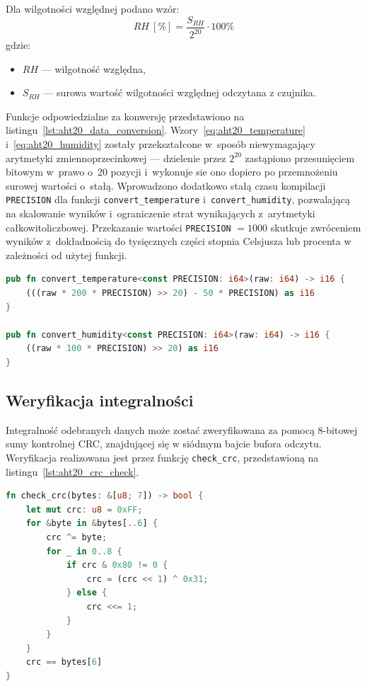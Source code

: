 Dla wilgotności względnej podano wzór:
\begin{equation}
    RH~[\%] = \frac{S_{RH}}{2^{20}} \cdot 100\%
    \label{eq:aht20_humidity}
\end{equation}
\noindent gdzie:
\begin{itemize}
    \item $RH$ --- wilgotność względna,
    \item $S_{RH}$ --- surowa wartość wilgotności względnej odczytana z czujnika.
\end{itemize}

\medskip

Funkcje odpowiedzialne za konwersję przedstawiono na 
listingu~\ref{lst:aht20_data_conversion}. 
Wzory~\eqref{eq:aht20_temperature} i~\eqref{eq:aht20_humidity} zostały 
przekształcone w~sposób niewymagający arytmetyki zmiennoprzecinkowej 
--- dzielenie przez $2^{20}$ zastąpiono przesunięciem bitowym w~prawo o~20 
pozycji i~wykonuje sie ono dopiero po przemnożeniu surowej wartości o~stałą. 
Wprowadzono dodatkowo stałą czasu kompilacji \texttt{PRECISION} dla funkcji
\texttt{convert\_temperature} i~\texttt{convert\_humidity}, pozwalającą na
skalowanie wyników i~ograniczenie strat wynikających z~arytmetyki 
całkowitoliczbowej. 
Przekazanie wartości \texttt{PRECISION} $= 1000$ skutkuje zwróceniem wyników 
z~dokładnością do tysięcznych części stopnia Celsjusza lub procenta w zależności
od użytej funkcji.

\begin{lstlisting}[language=Rust, style=colouredRust, caption={Konwersja surowych danych z modułu AHT20},
                   label={lst:aht20_data_conversion}]
pub fn convert_temperature<const PRECISION: i64>(raw: i64) -> i16 {
    (((raw * 200 * PRECISION) >> 20) - 50 * PRECISION) as i16
}

pub fn convert_humidity<const PRECISION: i64>(raw: i64) -> i16 {
    ((raw * 100 * PRECISION) >> 20) as i16
}
\end{lstlisting}

\subsection*{Weryfikacja integralności}
Integralność odebranych danych może zostać zweryfikowana za pomocą 8-bitowej 
sumy kontrolnej CRC, znajdującej się w siódmym bajcie bufora odczytu. 
Weryfikacja realizowana jest przez funkcję \texttt{check\_crc}, przedstawioną 
na listingu~\ref{lst:aht20_crc_check}.

\begin{lstlisting}[language=Rust, style=colouredRust, caption={Sprawdzanie sumy kontrolnej danych modułu AHT20},
                   label={lst:aht20_crc_check}]
fn check_crc(bytes: &[u8; 7]) -> bool {
    let mut crc: u8 = 0xFF;
    for &byte in &bytes[..6] {
        crc ^= byte;
        for _ in 0..8 {
            if crc & 0x80 != 0 {
                crc = (crc << 1) ^ 0x31;
            } else {
                crc <<= 1;
            }
        }
    }
    crc == bytes[6]
}
\end{lstlisting}

